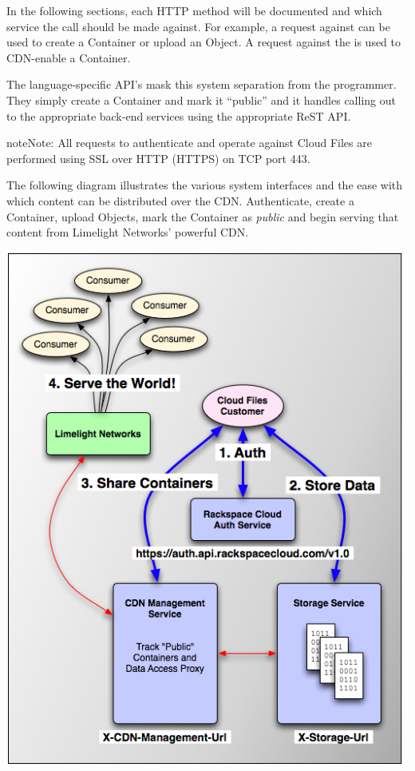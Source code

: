 \documentclass[letterpaper,10pt,english]{manual}
\begin{document}
In the following sections, each HTTP method will be documented and which
service the call should be made against.  For example, a  request
against  can be used to create a Container or upload an
Object.  A  request against the  is used
to CDN-enable a Container.

The language-specific API's mask this system separation from the
programmer.  They simply create a Container and mark it “public” and it
handles calling out to the appropriate back-end services using the
appropriate ReST API.

\begin{notice}{note}{Note:}
All requests to authenticate and operate against Cloud Files are
performed using SSL over HTTP (HTTPS) on TCP port 443.
\end{notice}

The following diagram illustrates the various system interfaces and the
ease with which content can be distributed over the CDN.  Authenticate,
create a Container, upload Objects, mark the Container as \emph{public} and
begin serving that content from Limelight Networks' powerful CDN.

{\hfill\includegraphics{cf-systems.jpg}\hfill}
\end{document}
